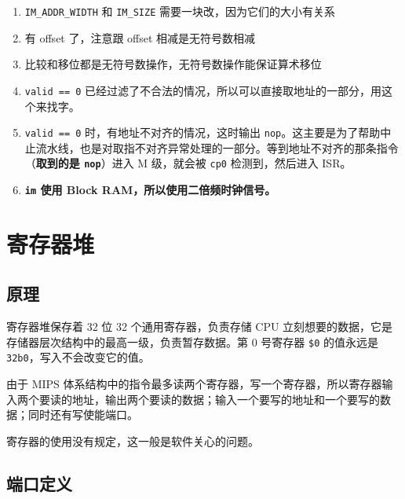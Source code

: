 \documentclass[12pt,AutoFakeBold,AutoFakeSlant]{article}
\providecommand{\tightlist}{%
  \setlength{\itemsep}{0pt}\setlength{\parskip}{0pt}}
\newcommand{\ms}[1]{\texttt{#1}}
\begin{document}
\begin{enumerate}
\def\labelenumi{\arabic{enumi}.}
\tightlist
\item
  \texttt{IM\_ADDR\_WIDTH} 和 \texttt{IM\_SIZE}
  需要一块改，因为它们的大小有关系
\item
  有 offset 了，注意跟 offset 相减是无符号数相减
\item
  比较和移位都是无符号数操作，无符号数操作能保证算术移位
\item
  \ms{valid == 0} 已经过滤了不合法的情况，所以可以直接取地址的一部分，用这个来找字。
\item
  \ms{valid == 0} 时，有地址不对齐的情况，这时输出 \ms{nop}。这主要是为了帮助中止流水线，也是对取指不对齐异常处理的一部分。等到地址不对齐的那条指令（\textbf{取到的是 \ms{nop}}）进入 M 级，就会被 \ms{cp0} 检测到，然后进入 ISR。
\item
  \textbf{\ms{im} 使用 Block RAM，所以使用二倍频时钟信号。}
\end{enumerate}

\hypertarget{ux5bc4ux5b58ux5668ux5806}{%
\section{寄存器堆}\label{ux5bc4ux5b58ux5668ux5806}}

\hypertarget{ux539fux7406-3}{%
\subsection{原理}\label{ux539fux7406-3}}

寄存器堆保存着 32 位 32 个通用寄存器，负责存储 CPU
立刻想要的数据，它是存储器层次结构中的最高一级，负责暂存数据。第 0
号寄存器 \texttt{\$0} 的值永远是
\texttt{32\textquotesingle{}b0}，写入不会改变它的值。

由于 MIPS
体系结构中的指令最多读两个寄存器，写一个寄存器，所以寄存器输入两个要读的地址，输出两个要读的数据；输入一个要写的地址和一个要写的数据；同时还有写使能端口。

寄存器的使用没有规定，这一般是软件关心的问题。

\hypertarget{ux7aefux53e3ux5b9aux4e49-2}{%
\subsection{端口定义}\label{ux7aefux53e3ux5b9aux4e49-2}}
\end{document}
